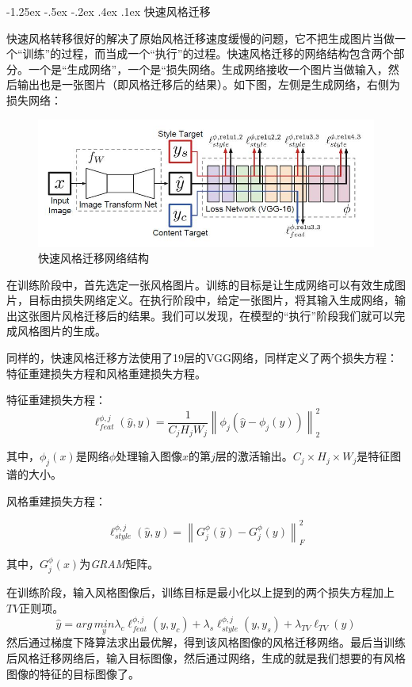 \documentclass[a4paper, 11pt]{article}
\makeatletter
\newcommand{\xiaosihao}{\fontsize{12pt}{\baselineskip}\selectfont}
\renewcommand\subsection{\@startsection{subsection}{1}{\z@}%
{-1.25ex \@plus -.5ex \@minus -.2ex}%
{.4ex \@plus .1ex}%
{\normalfont\xiaosihao\CJKfamily{hei}}}
\makeatother
\begin{document}
\subsection{快速风格迁移}
\label{subsection:快速风格迁移}

快速风格转移很好的解决了原始风格迁移速度缓慢的问题，它不把生成图片当做一个“训练”的过程，而当成一个“执行”的过程。快速风格迁移的网络结构包含两个部分。一个是“生成网络”，一个是“损失网络。生成网络接收一个图片当做输入，然后输出也是一张图片（即风格迁移后的结果）。如下图，左侧是生成网络，右侧为损失网络：
\begin{figure}
\centering
\includegraphics[width=5.00in,height=1.8 in]{imgs/fast_cnn_transfer.jpg}
\caption{快速风格迁移网络结构}
\end{figure}
在训练阶段中，首先选定一张风格图片。训练的目标是让生成网络可以有效生成图片，目标由损失网络定义。在执行阶段中，给定一张图片，将其输入生成网络，输出这张图片风格迁移后的结果。我们可以发现，在模型的“执行”阶段我们就可以完成风格图片的生成。

同样的，快速风格迁移方法使用了19层的VGG网络，同样定义了两个损失方程：特征重建损失方程和风格重建损失方程。

特征重建损失方程：
\begin{equation}
\ell^{\phi,j}_{feat}(\hat{y},y)=\frac{1}{C_jH_jW_j}\left \|\phi_j(\hat{y}-\phi_j(y))  \right \|^2_2
\end{equation}

其中，$\phi_j(x)$是网络$\phi$处理输入图像$x$的第$j$层的激活输出。$C_j\times H_j \times W_j$是特征图谱的大小。

风格重建损失方程：

\begin{equation}
\ell^{\phi,j}_{style}(\hat{y},y)=\left \|G^{\phi}_j(\hat{y})-G^{\phi}_j(y)  \right \|^2_F
\end{equation}

其中，$G^\phi_j(x)$为\emph{GRAM}矩阵。

在训练阶段，输入风格图像后，训练目标是最小化以上提到的两个损失方程加上$TV$正则项。
\begin{equation}
\hat{y}=arg\,\underset{y}{min}\lambda_c\ell^{\phi,j}_{feat}(y,y_c)+\lambda_s\ell^{\phi,j}_{style}(y,y_s)+\lambda_{TV}\ell_{TV}(y)
\end{equation}
然后通过梯度下降算法求出最优解，得到该风格图像的风格迁移网络。最后当训练后风格迁移网络后，输入目标图像，然后通过网络，生成的就是我们想要的有风格图像的特征的目标图像了。
\end{document}
